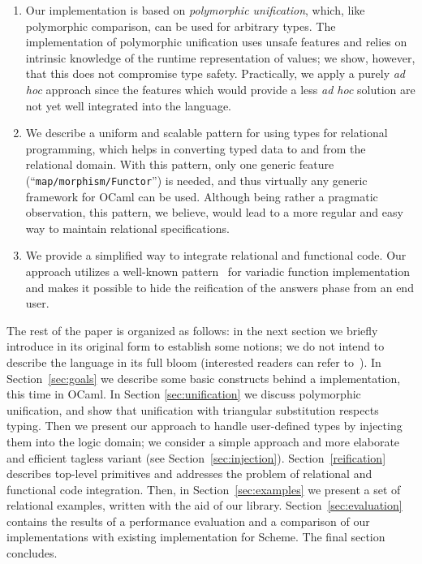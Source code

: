 \begin{enumerate}
\item Our implementation is based on \emph{polymorphic unification}, which, like polymorphic comparison,
can be used for arbitrary types. The implementation of polymorphic unification uses unsafe features and
relies on intrinsic knowledge of the runtime representation of values; we show, however, that this does not
compromise type safety. Practically, we apply a purely \emph{ad hoc} approach since the features 
which would provide a less \emph{ad hoc} solution are not yet well integrated into the language.

\item We describe a uniform and scalable pattern for using types for relational programming, which
helps in converting typed data to and from the relational domain. With this pattern, only one
generic feature (``\lstinline{map/morphism/Functor}'') is needed, and thus virtually any generic 
framework for OCaml can be used. Although being rather a pragmatic observation, this pattern, we
believe, would lead to a more regular and easy way to maintain relational specifications.

\item We provide a simplified way to integrate relational and functional code. Our approach utilizes
a well-known pattern~\cite{Unparsing, DoWeNeed} for variadic function implementation and makes it
possible to hide the reification of the answers phase from an end user.
\end{enumerate}

The rest of the paper is organized as follows: in the next section we briefly introduce \miniKanren in
its original form to establish some notions; we do not intend to describe the language in its full bloom (interested readers can
refer to~\cite{TRS}). In Section~\ref{sec:goals} we describe some basic constructs behind a \miniKanren implementation, this time 
in OCaml. In Section \ref{sec:unification} we discuss polymorphic unification, and show that unification with 
triangular substitution respects typing. Then we present our approach to handle user-defined types by injecting them 
into the logic domain; we consider a simple approach and more elaborate and efficient tagless variant (see Section~\ref{sec:injection}). 
Section~\ref{reification} describes top-level primitives and addresses the problem of relational and functional code integration. 
Then, in Section~\ref{sec:examples} we present a set of relational examples, written with the aid of our 
library. Section~\ref{sec:evaluation} contains the results of a performance evaluation and a comparison of our implementations 
with existing implementation for Scheme. The final section concludes.

